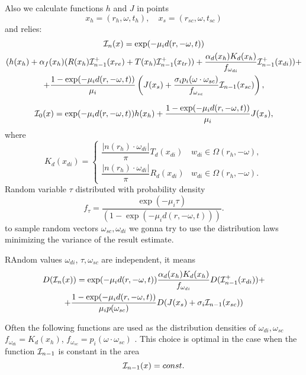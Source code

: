 \documentclass[12pt,reqno]{report}
\begin{document}
Also we calculate functions $h$ and $J$ in points
$$
x_h=(r_h,\omega,t_h),\quad
x_s=(r_{sc},\omega,t_{sc})
$$
and relies:
\begin{multline}
{\cal I}_n(x) = \exp(-\mu_i d(r, -\omega, t)) 
\\ (h(x_h) +  \alpha_f (x_h)(R(x_h) {\cal I}_{n-1}^+
(x_{re}) + T(x_h) {\cal I}_{n-1}^+ (x_{tr})) + \frac{\alpha_d(x_h) K_d(x_h)} {f_{\omega_{di}}} {\cal I}_{n-1}^+ (x_{di})) +
\\ + \frac{1 - \exp(-\mu_i d(r, -\omega, t))}{\mu_i} \left(J(x_s) + \frac{\sigma_i p_i(\omega \cdot \omega_{sc})} { f_{\omega_{sc}}} {\cal I}_{n-1}(x_{sc})\right),
\end{multline}


\begin{equation}
{\cal I}_0(x) = \exp(-\mu_i d(r, -\omega, t)) h(x_h) +
\frac{1 - \exp(-\mu_i d(r, -\omega, t))}{\mu_i} J(x_s),
\end{equation}
where
$$
K_d(x_{di}) = \left \{ 
\begin{array}{ll} 
	\dfrac{|n(r_h)\cdot \omega_{di}|}{\pi} T_d(x_{di}) & w_{di} \in \Omega(r_h,-\omega), \\
	\dfrac{|n(r_h)\cdot \omega_{di}|}{\pi} R_d(x_{di}) & w_{di} \in \Omega(r_h,-\omega).
\end{array} \right.
$$
Random variable $\tau$ distributed with probability density
$$
f_\tau = \displaystyle{\frac{\exp(-\mu_i \tau)}{(1-\exp(-\mu_i d(r,
-\omega, t)))}}.
$$
to sample random vectors $\omega_{sc}, \omega_{di} $ we gonna try to use the distribution laws 
minimizing the variance of the result estimate.

RAndom values $\omega_{di}$, $\tau, \omega_{sc}$ are independent, it means
\begin{multline}
D({\cal I}_n(x)) = \exp(-\mu_i d(r, -\omega, t)) \frac{\alpha_d(x_h) K_d(x_h)} {f_{\omega_{di}}} D({\cal I}_{n-1}^+ (x_{di})) + \\
 + \frac{1 - \exp(-\mu_i d(r, -\omega, t))}{\mu_i p(\omega_{sc})} D(J(x_{s}) + \sigma_i {\cal I}_{n-1}(x_{sc}))
\end{multline}

Often the following functions are used as the distribution densities of $\omega_{di}, \omega_{sc}$
${\displaystyle f_{\omega_{di}} = K_d(x_h)}$, 
${\displaystyle f_{\omega_{sc}} = p_i(\omega \cdot \omega_{sc}) }$ \cite{33}.
This choice is optimal in the case when the function ${\cal I}_{n-1}$ is constant in the area
\begin{equation}
{\cal I}_{n-1}(x) = const.
\end{equation}
\end{document}
